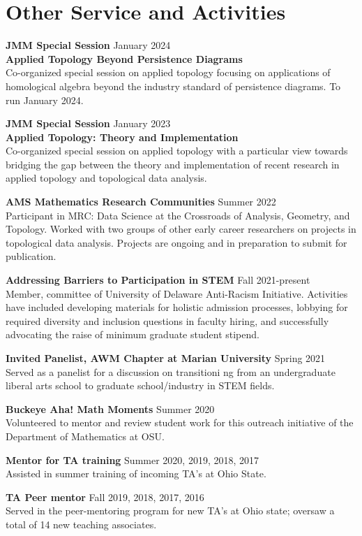 \documentclass[10pt,letterpaper]{article}
\renewenvironment{itemize}{
  \begin{list}{}{
    \setlength{\leftmargin}{1.5em}
    \setlength{\itemsep}{0.25em}
    \setlength{\parskip}{0pt}
    \setlength{\parsep}{0.25em}
  }
}{
  \end{list}
}
\begin{document}
\section*{Other Service and Activities}

\begin{itemize}
\item{\bf JMM Special Session} \hfill January 2024\\{\bf Applied Topology Beyond Persistence Diagrams}\\
{Co-organized special session on applied topology focusing on applications of homological algebra beyond the industry standard of persistence diagrams. To run January 2024.}




\item{\bf JMM Special Session} \hfill January 2023\\{\bf Applied Topology: Theory and Implementation}\\
{Co-organized special session on applied topology with a particular view towards bridging the gap between the theory and implementation of recent research in applied topology and topological data analysis.}
\item {\bf AMS Mathematics Research Communities} \hfill Summer 2022\\
{Participant in MRC: Data Science at the Crossroads of Analysis, Geometry, and Topology. Worked with two groups of other early career researchers on projects in topological data analysis. Projects are ongoing and in preparation to submit for publication.}
\item {\bf Addressing Barriers to Participation in STEM} \hfill Fall 2021-present\\
{Member, committee of University of Delaware Anti-Racism Initiative. Activities have included developing materials for holistic admission processes, lobbying for required diversity and inclusion questions in faculty hiring, and successfully advocating the raise of minimum graduate student stipend.}
\item{\bf Invited Panelist, AWM Chapter at Marian University} \hfill Spring 2021\\
{Served as a panelist for a discussion on transitioni ng from an undergraduate liberal arts school to graduate school/industry in STEM fields.}
\item {\bf Buckeye Aha! Math Moments} \hfill Summer 2020 \\
  {Volunteered to mentor and review student work for this outreach initiative of the Department of Mathematics at OSU.}
\item {\bf Mentor for TA training}
  \hfill Summer 2020, 2019, 2018, 2017 \\
  {Assisted in summer training of incoming TA's at Ohio State. }
\item {\bf TA Peer mentor} \hfill Fall 2019, 2018, 2017, 2016 \\
  {Served in the peer-mentoring program for new TA's at Ohio state; oversaw a total of 14 new teaching associates.}

\end{itemize}
\end{document}
